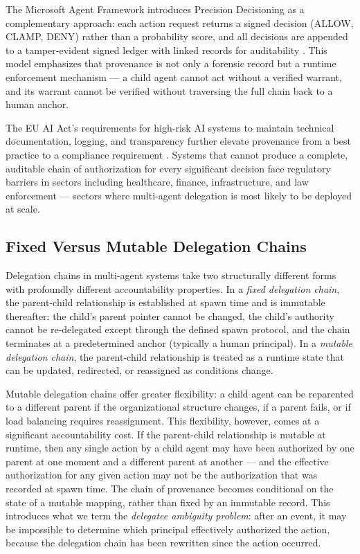 The Microsoft Agent Framework introduces Precision Decisioning as a complementary approach: each action request returns a signed decision (ALLOW, CLAMP, DENY) rather than a probability score, and all decisions are appended to a tamper-evident signed ledger with linked records for auditability \cite{microsoft-agent-framework2025}. This model emphasizes that provenance is not only a forensic record but a runtime enforcement mechanism — a child agent cannot act without a verified warrant, and its warrant cannot be verified without traversing the full chain back to a human anchor.

The EU AI Act's requirements for high-risk AI systems to maintain technical documentation, logging, and transparency further elevate provenance from a best practice to a compliance requirement \cite{eu-ai-act2024}. Systems that cannot produce a complete, auditable chain of authorization for every significant decision face regulatory barriers in sectors including healthcare, finance, infrastructure, and law enforcement — sectors where multi-agent delegation is most likely to be deployed at scale.

\subsection{Fixed Versus Mutable Delegation Chains}

Delegation chains in multi-agent systems take two structurally different forms with profoundly different accountability properties. In a \emph{fixed delegation chain}, the parent-child relationship is established at spawn time and is immutable thereafter: the child's parent pointer cannot be changed, the child's authority cannot be re-delegated except through the defined spawn protocol, and the chain terminates at a predetermined anchor (typically a human principal). In a \emph{mutable delegation chain}, the parent-child relationship is treated as a runtime state that can be updated, redirected, or reassigned as conditions change.

Mutable delegation chains offer greater flexibility: a child agent can be reparented to a different parent if the organizational structure changes, if a parent fails, or if load balancing requires reassignment. This flexibility, however, comes at a significant accountability cost. If the parent-child relationship is mutable at runtime, then any single action by a child agent may have been authorized by one parent at one moment and a different parent at another — and the effective authorization for any given action may not be the authorization that was recorded at spawn time. The chain of provenance becomes conditional on the state of a mutable mapping, rather than fixed by an immutable record. This introduces what we term the \emph{delegatee ambiguity problem}: after an event, it may be impossible to determine which principal effectively authorized the action, because the delegation chain has been rewritten since the action occurred.

